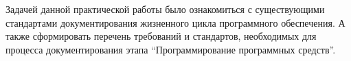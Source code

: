 
\pagebreak
{}

Задачей данной практической работы было ознакомиться с существующими стандартами документирования жизненного цикла программного обеспечения.
А также сформировать перечень требований и стандартов, необходимых для процесса документирования этапа \enquote{Программирование программных средств}.
